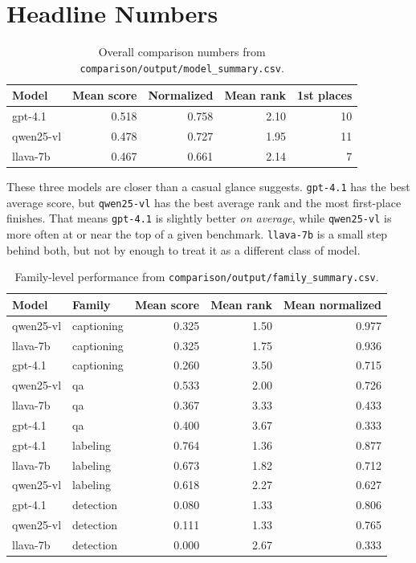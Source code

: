 \documentclass[11pt]{article}
\begin{document}
\section{Headline Numbers}
\begin{table}[H]
\centering
\caption{Overall comparison numbers from \texttt{comparison/output/model\_summary.csv}.}
\begin{tabular}{>{\ttfamily}lrrrr}
\toprule
Model & Mean score & Normalized & Mean rank & 1st places \\
\midrule
gpt-4.1 & 0.518 & 0.758 & 2.10 & 10 \\
qwen25-vl & 0.478 & 0.727 & 1.95 & 11 \\
llava-7b & 0.467 & 0.661 & 2.14 & 7 \\
\bottomrule
\end{tabular}
\end{table}

\noindent
These three models are closer than a casual glance suggests. \texttt{gpt-4.1} has the best average score, but \texttt{qwen25-vl} has the best average rank and the most first-place finishes. That means \texttt{gpt-4.1} is slightly better \emph{on average}, while \texttt{qwen25-vl} is more often at or near the top of a given benchmark. \texttt{llava-7b} is a small step behind both, but not by enough to treat it as a different class of model.

\begin{table}[H]
\centering
\caption{Family-level performance from \texttt{comparison/output/family\_summary.csv}.}
\begin{tabular}{>{\ttfamily}l>{\ttfamily}lrrr}
\toprule
Model & Family & Mean score & Mean rank & Mean normalized \\
\midrule
qwen25-vl & captioning & 0.325 & 1.50 & 0.977 \\
llava-7b & captioning & 0.325 & 1.75 & 0.936 \\
gpt-4.1 & captioning & 0.260 & 3.50 & 0.715 \\
\midrule
qwen25-vl & qa & 0.533 & 2.00 & 0.726 \\
llava-7b & qa & 0.367 & 3.33 & 0.433 \\
gpt-4.1 & qa & 0.400 & 3.67 & 0.333 \\
\midrule
gpt-4.1 & labeling & 0.764 & 1.36 & 0.877 \\
llava-7b & labeling & 0.673 & 1.82 & 0.712 \\
qwen25-vl & labeling & 0.618 & 2.27 & 0.627 \\
\midrule
gpt-4.1 & detection & 0.080 & 1.33 & 0.806 \\
qwen25-vl & detection & 0.111 & 1.33 & 0.765 \\
llava-7b & detection & 0.000 & 2.67 & 0.333 \\
\bottomrule
\end{tabular}
\end{table}
\end{document}
